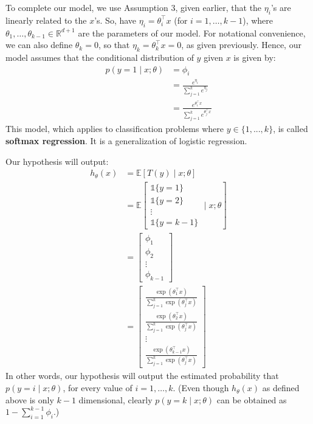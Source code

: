 To complete our model, we use Assumption 3, given earlier, that the $\eta_i$'s
are linearly related to the $x$'s. So, have $\eta_i = \theta^\top_i x$ (for $i = 1,\ldots, k-1$),
where $\theta_1,\ldots, \theta_{k-1} \in \mathbb R^{d+1}$ are the parameters of our model. For notational
convenience, we can also define $\theta_k = 0$, so that $\eta_k = \theta^\top_k x = 0$, as given
previously. Hence, our model assumes that the conditional distribution of $y$
given $x$ is given by:
\begin{align}
    p(y=1 \mid x; \theta) &= \phi_i\\
                          &= \frac{e^{\eta_i}}{\sum_{j=1}^k e^{\eta_j}}\\
                          &= \frac{e^{\theta^\top_i x}}{\sum_{j=1}^k e^{\theta^\top_j x}} \label{eq:cond_distr}
\end{align}
This model, which applies to classification problems where $y \in \{1,...,k\}$, is
called \textbf{softmax regression}. It is a generalization of logistic regression.

Our hypothesis will output:
\begin{align}
    h_\theta(x) &= \mathbb E \left[ T(y) \mid x; \theta \right]\\
                &= \mathbb E \left[\begin{matrix}\mathbb{1}\{y=1\}\\\mathbb{1}\{y=2\}\\\vdots\\\mathbb{1}\{y=k-1\}\end{matrix} \mid x; \theta \right]\\    
                &= \begin{bmatrix}\phi_1\\\phi_2\\\vdots\\\phi_{k-1}\end{bmatrix}\\
                &= \begin{bmatrix}\frac{\exp(\theta^\top_1 x)}{\sum_{j=1}^k \exp(\theta^\top_j x)}\\\frac{\exp(\theta^\top_2 x)}{\sum_{j=1}^k \exp(\theta^\top_j x)}\\\vdots\\\frac{\exp(\theta^\top_{k-1} x)}{\sum_{j=1}^k \exp(\theta^\top_j x)}\end{bmatrix}
\end{align}
In other words, our hypothesis will output the estimated probability that
$p(y = i \mid x;\theta)$, for every value of $i = 1,\ldots,k$. (Even though $h_\theta (x)$ as defined
above is only $k - 1$ dimensional, clearly $p(y = k \mid x;\theta)$ can be obtained as $1 - \sum^{k-1}_{i=1} \phi_i$.)

